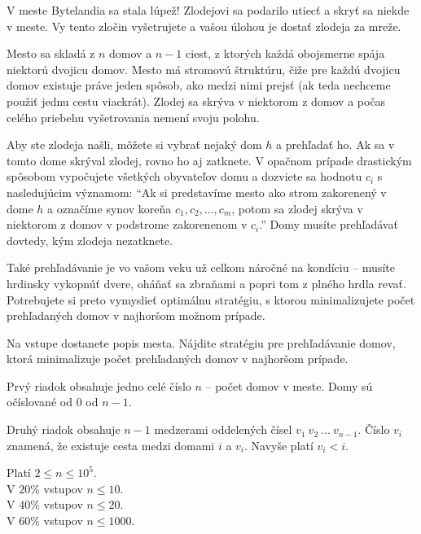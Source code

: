 





V meste Bytelandia sa stala lúpež! Zlodejovi sa podarilo utiecť a skryť sa
niekde v meste. Vy tento zločin vyšetrujete a vašou úlohou je dostať zlodeja za
mreže.

Mesto sa skladá z $n$ domov a $n-1$ ciest, z ktorých každá obojsmerne spája
niektorú dvojicu domov. Mesto má stromovú štruktúru, čiže pre každú dvojicu
domov existuje práve jeden spôsob, ako medzi nimi prejsť (ak teda nechceme
použiť jednu cestu viackrát). Zlodej sa skrýva v niektorom z domov a počas
celého priebehu vyšetrovania nemení svoju polohu.

Aby ste zlodeja našli, môžete si vybrať nejaký dom $h$ a prehľadať ho. Ak sa v
tomto dome skrýval zlodej, rovno ho aj zatknete. V opačnom prípade drastickým
spôsobom vypočujete všetkých obyvateľov domu a dozviete sa hodnotu $c_i$ s
nasledujúcim významom: ``Ak si predstavíme mesto ako strom zakorenený v dome $h$
a označíme synov koreňa $c_1, c_2, \dots, c_m$, potom sa zlodej skrýva v
niektorom z domov v podstrome zakorenenom v $c_i$.'' Domy musíte prehľadávať
dovtedy, kým zlodeja nezatknete.

Také prehľadávanie je vo vašom veku už celkom náročné na kondíciu -- musíte
hrdinsky vykopnúť dvere, oháňať sa zbraňami a popri tom z plného hrdla revať.
Potrebujete si preto vymyslieť optimálnu stratégiu, s ktorou minimalizujete
počet prehľadaných domov v najhoršom možnom prípade.


Na vstupe dostanete popis mesta. Nájdite stratégiu pre prehľadávanie domov,
ktorá minimalizuje počet prehľadaných domov v najhoršom prípade.


Prvý riadok obsahuje jedno celé číslo $n$ -- počet domov v meste. Domy sú
očíslované od $0$ od $n-1$.

Druhý riadok obsahuje $n-1$ medzerami oddelených čísel $v_1~v_2~\dots~v_{n-1}$.
Číslo $v_i$ znamená, že existuje cesta medzi domami $i$ a $v_i$. Navyše platí
$v_i < i$.

\smallskip
\noindent
Platí $2 \leq n \leq 10^5$.\\
V $20\%$ vstupov $n \leq 10$.\\
V $40\%$ vstupov $n \leq 20$.\\
V $60\%$ vstupov $n \leq 1000$.

